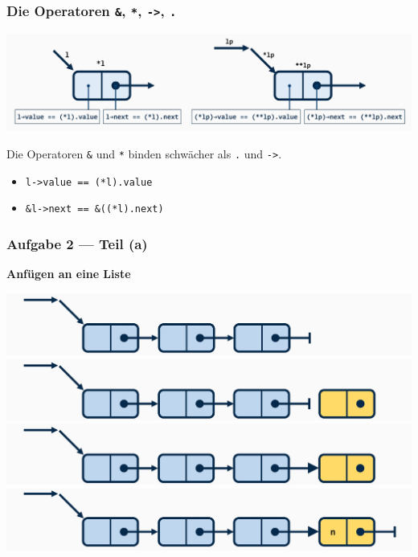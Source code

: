 \documentclass{beamer}
\begin{document}
\begin{frame}[fragile] \frametitle{Die Operatoren \texttt{\&}, \texttt{*}, \texttt{->}, \texttt{.}}
	\begin{center}
		\includegraphics[width=\linewidth]{tut06-graphics/tut06-liste-zugriff}
	\end{center}

	Die Operatoren \texttt{\&} und \texttt{*} binden schwächer als \texttt{.} und \texttt{->}.
	\begin{itemize}
		\item \lstinline{l->value == (*l).value}
		\item \lstinline{&l->next == &((*l).next)}
	\end{itemize}
\end{frame}

\begin{frame} \frametitle{Aufgabe 2 --- Teil (a)}
	\textbf{Anfügen an eine Liste}
	
	\includegraphics[width=\linewidth]{tut06-graphics/tut06-append1} \\ \pause
	\includegraphics[width=\linewidth]{tut06-graphics/tut06-append2} \\ \pause
	\includegraphics[width=\linewidth]{tut06-graphics/tut06-append3} \\ \pause
	\includegraphics[width=\linewidth]{tut06-graphics/tut06-append4}
\end{frame}
\end{document}
